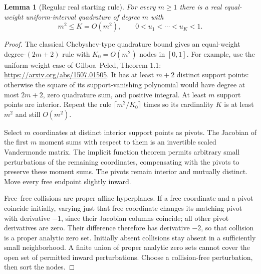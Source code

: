 \documentclass[11pt]{article}
\newtheorem{lemma}[theorem]{Lemma}
\begin{document}
\begin{lemma}[Regular real starting rule]\label{lem:real}
For every $m\ge1$ there is a real equal-weight uniform-interval quadrature
of degree $m$ with
\[
 m^2\le K=O(m^2),\qquad 0<u_1<\cdots<u_K<1.
\]
\end{lemma}
\begin{proof}
The classical Chebyshev-type quadrature bound gives an equal-weight
degree-$(2m+2)$ rule with $K_0=O(m^2)$ nodes in $[0,1]$.
For example, use the uniform-weight case of Gilboa--Peled, Theorem 1.1:
\url{https://arxiv.org/abs/1507.01505}.
It has at least $m+2$ distinct support points: otherwise the square of
its support-vanishing polynomial would have degree at most $2m+2$,
zero quadrature sum, and positive integral. At least $m$ support points
are interior. Repeat the rule $\lceil m^2/K_0\rceil$ times so its
cardinality $K$ is at least $m^2$ and still $O(m^2)$.

Select $m$ coordinates at distinct interior support points as pivots.
The Jacobian of the first $m$ moment sums with respect to them is an
invertible scaled Vandermonde matrix. The implicit function theorem permits
arbitrary small perturbations of the remaining coordinates, compensating
with the pivots to preserve these moment sums. The pivots remain interior
and mutually distinct. Move every free endpoint slightly inward.

Free--free collisions are proper affine hyperplanes. If a free coordinate
and a pivot coincide initially, varying just that free coordinate changes
its matching pivot with derivative $-1$, since their Jacobian columns
coincide; all other pivot derivatives are zero. Their difference therefore
has derivative $-2$, so that collision is a proper analytic zero set.
Initially absent collisions stay absent in a sufficiently small
neighborhood. A finite union of proper analytic zero sets cannot cover
the open set of permitted inward perturbations. Choose a collision-free
perturbation, then sort the nodes.
\end{proof}
\end{document}

